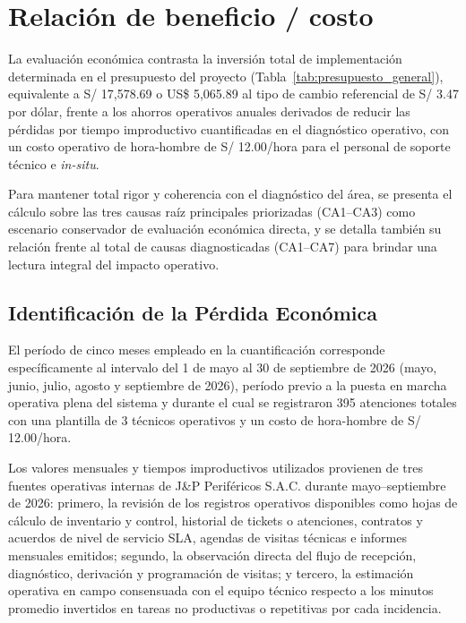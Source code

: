 \section{Relación de beneficio / costo}

La evaluación económica contrasta la inversión total de implementación determinada en el presupuesto del proyecto (Tabla~\ref{tab:presupuesto_general}), equivalente a S/ 17,578.69 o US\$ 5,065.89 al tipo de cambio referencial de S/ 3.47 por dólar, frente a los ahorros operativos anuales derivados de reducir las pérdidas por tiempo improductivo cuantificadas en el diagnóstico operativo, con un costo operativo de hora-hombre de S/ 12.00/hora para el personal de soporte técnico e \textit{in-situ}.

Para mantener total rigor y coherencia con el diagnóstico del área, se presenta el cálculo sobre las tres causas raíz principales priorizadas (CA1–CA3) como escenario conservador de evaluación económica directa, y se detalla también su relación frente al total de causas diagnosticadas (CA1–CA7) para brindar una lectura integral del impacto operativo.

\subsection{Identificación de la Pérdida Económica}

El período de cinco meses empleado en la cuantificación corresponde específicamente al intervalo del 1 de mayo al 30 de septiembre de 2026 (mayo, junio, julio, agosto y septiembre de 2026), período previo a la puesta en marcha operativa plena del sistema y durante el cual se registraron 395 atenciones totales con una plantilla de 3 técnicos operativos y un costo de hora-hombre de S/ 12.00/hora.

Los valores mensuales y tiempos improductivos utilizados provienen de tres fuentes operativas internas de J\&P Periféricos S.A.C. durante mayo–septiembre de 2026: primero, la revisión de los registros operativos disponibles como hojas de cálculo de inventario y control, historial de tickets o atenciones, contratos y acuerdos de nivel de servicio SLA, agendas de visitas técnicas e informes mensuales emitidos; segundo, la observación directa del flujo de recepción, diagnóstico, derivación y programación de visitas; y tercero, la estimación operativa en campo consensuada con el equipo técnico respecto a los minutos promedio invertidos en tareas no productivas o repetitivas por cada incidencia.

